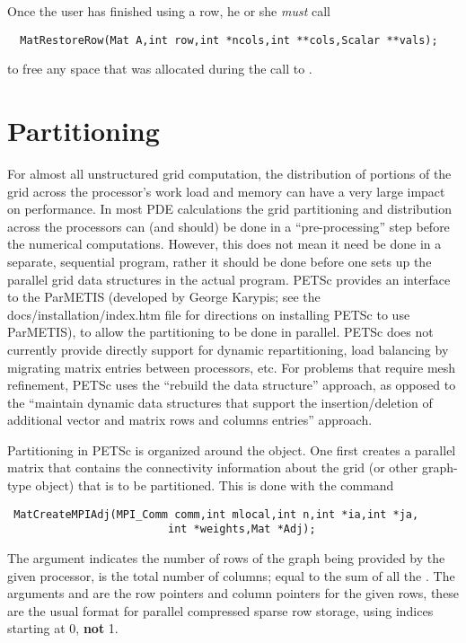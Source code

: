 Once the user has finished using a row, he or she {\em must} call 
\begin{verbatim}
  MatRestoreRow(Mat A,int row,int *ncols,int **cols,Scalar **vals);
\end{verbatim}
to free any space that was allocated during the call to .

\section{Partitioning}
\label{sec:partitioning}  

For almost all unstructured grid computation, the distribution of portions of 
the grid across the processor's work load and memory can have a very large
impact on performance. In most PDE calculations the grid partitioning and 
distribution across the processors can (and should) be done in a ``pre-processing'' step
before the numerical computations. However, this does not mean it need be done
in a separate, sequential program, rather it should be done before one sets up the 
parallel grid data structures in the actual program. PETSc provides an interface to
the ParMETIS (developed by George Karypis; see the docs/installation/index.htm file
for directions on installing PETSc to use ParMETIS), to allow the partitioning to be done in
parallel. PETSc does not currently provide directly support for dynamic
repartitioning, load balancing by migrating matrix entries between processors, etc.
For problems that require mesh refinement, PETSc uses the ``rebuild the data structure''
approach, as opposed to the ``maintain dynamic data structures that support the 
insertion/deletion of additional vector and matrix rows and columns entries'' approach.

Partitioning in PETSc is organized around the  object. 
One first creates a parallel matrix that contains the connectivity information about the 
grid (or other graph-type object) that is to be partitioned. This is done with the 
command
\begin{verbatim}
 MatCreateMPIAdj(MPI_Comm comm,int mlocal,int n,int *ia,int *ja,
                         int *weights,Mat *Adj);
\end{verbatim}
The argument  indicates the number of rows of the graph being provided
by the given processor,  is the total number of columns; equal to the 
sum of all the . The arguments  and  are the row pointers
and column pointers for the given rows, these are the usual format for parallel 
compressed sparse row storage, using indices starting at 0, {\bf not} 1.

